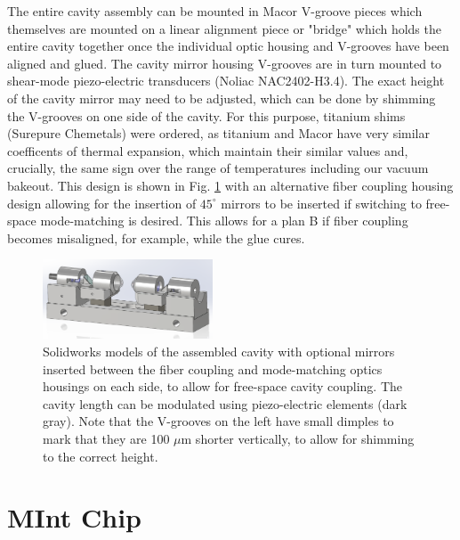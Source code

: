 The entire cavity assembly can be mounted in Macor V-groove pieces which themselves are mounted on a linear alignment piece or "bridge" which holds the entire cavity together once the individual optic housing and V-grooves have been aligned and glued. The cavity mirror housing V-grooves are in turn mounted to shear-mode piezo-electric transducers (Noliac NAC2402-H3.4). The exact height of the cavity mirror may need to be adjusted, which can be done by shimming the V-grooves on one side of the cavity. For this purpose, titanium shims (Surepure Chemetals) were ordered, as titanium and Macor have very similar coefficents of thermal expansion, which maintain their similar values and, crucially, the same sign over the range of temperatures including our vacuum bakeout. This design is shown in Fig. \ref{fig:cavitybridge} with an alternative fiber coupling housing design allowing for the insertion of $45^{\circ}$ mirrors to be inserted if switching to free-space mode-matching is desired. This allows for a plan B if fiber coupling becomes misaligned, for example, while the glue cures.
\begin{figure}[!ht]
    \centering
    \includegraphics[width=0.45\textwidth]{Images/cavitybridge.pdf}
    \caption{Solidworks models of the assembled cavity with optional mirrors inserted between the fiber coupling and mode-matching optics housings on each side, to allow for free-space cavity coupling. The cavity length can be modulated using piezo-electric elements (dark gray). Note that the V-grooves on the left have small dimples to mark that they are 100 $\mu \mathrm{m}$ shorter vertically, to allow for shimming to the correct height.}
    \label{fig:cavitybridge}
\end{figure}

\section{MInt Chip}\label{sec:mintchip}

